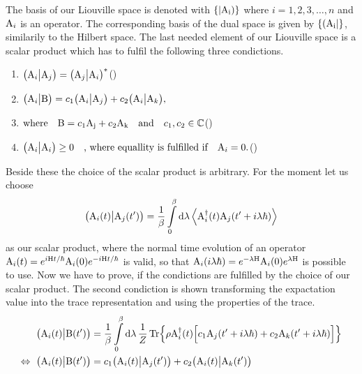 The basis of our Liouville space is denoted with $\{|\mathrm{\mathrm{A}_{i}})\}$ where $i = 1,2,3,\dots,n$ and $\mathrm{A}_{i}$ is an operator.
The corresponding basis of the dual space is given by $\{(\mathrm{\mathrm{A}_{i}}|\}$, similarily to the Hilbert space.
The last needed element of our Liouville space is a scalar product which has to fulfil the following three condictions.
%
\begin{enumerate}
	\item $\begin{aligned} \big({\mathrm{A}_{i}}\big|{\mathrm{A}_{j}}\big) = \big({\mathrm{A}_{j}}\big|{\mathrm{A}_{i}}\big)^{*} \end{aligned}$\hfill {}(\theequation)
	\item $\begin{aligned} \big({\mathrm{A}_{i}}\big|{\mathrm{B}}\big) = c_{1} \big({\mathrm{A}_{i}}\big|{\mathrm{A}_{j}}\big) + c_{2} \big({\mathrm{A}_{i}}\big|{\mathrm{A}_{k}}\big), \end{aligned}$
	\item[] $\begin{aligned} \text{where\ \ \ } \mt{B} = c_{1} \mt{A_{j}} + c_{2} \mt{A_{k}} \qq{and} c_{1}, c_{2} \in \mathbb{C} \end{aligned}$\hfill {}(\theequation)
	\item $\begin{aligned} \obraket{\mt{A}_{i}}{\mt{A}_{i}}\geq 0 \qq{, where equallity is fulfilled if} \mt{A}_{i} = 0. \end{aligned}$\hfill {}(\theequation)
\end{enumerate}
%
Beside these the choice of the scalar product is arbitrary.
For the moment let us choose 
%
\begin{align}
	\big({\mathrm{A}_{i}(t)}\big|{\mathrm{A}_{j}(t')}\big) = \frac{1}{\beta} \int\limits_{0}^{\beta} \dd{\lambda} \expval{\mathrm{A}_{i}^{\dag}(t) \mathrm{A}_{j}(t'+i\lambda\hbar)}
	\label{eq:scalar product Liouville space2.0}
\end{align}
%
as our scalar product, where the normal time evolution of an operator \linebreak$\mathrm{A}_{i}(t) = e^{i\mathrm{H}t/\hbar} \mathrm{A}_{i}(0) e^{-i\mathrm{H}t/\hbar}$ is valid, so that $\mathrm{A}_{i}(i\lambda\hbar) = e^{-\lambda\mathrm{H}} \mathrm{A}_{i}(0) e^{\lambda\mathrm{H}}$ is possible to use.
Now we have to prove, if the condictions are fulfilled by the choice of our scalar product.
The second condiction is shown transforming the expactation value into the trace representation and using the properties of the trace.
%
\begin{align}
	\big({\mathrm{A}_{i}(t)}\big|{\mathrm{B}(t')}\big) &= \frac{1}{\beta} \int\limits_{0}^{\beta} \dd{\lambda} \frac{1}{Z} \Tr{\rho \mathrm{A}_{i}^{\dag}(t) \Big[c_{1} \mathrm{A}_{j}(t'+i\lambda\hbar) + c_{2} \mathrm{A}_{k}(t'+i\lambda\hbar)\Big]}
	\notag \\
	\Leftrightarrow\ \big({\mathrm{A}_{i}(t)}\big|{\mathrm{B}(t')}\big) &= c_{1} \big({\mathrm{A}_{i}(t)}\big|{\mathrm{A}_{j}(t')}\big) + c_{2} \big({\mathrm{A}_{i}(t)}\big|{\mathrm{A}_{k}(t')}\big)
\end{align}
